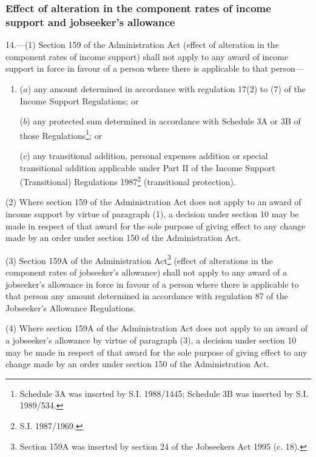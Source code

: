 \documentclass[12pt,a4paper]{article}
\begin{document}
\subsubsection[14. Effect of alteration in the component rates of income support and jobseeker’s allowance]{Effect of alteration in the component rates of income support and jobseeker’s allowance}

14.—(1) Section 159 of the Administration Act (effect of alteration in the component rates of income support) shall not apply to any award of income support in force in favour of a person where there is applicable to that person—
\begin{enumerate}\item[]
($a$) any amount determined in accordance with regulation 17(2) to (7) of the Income Support Regulations; or

($b$) any protected sum determined in accordance with Schedule 3A or 3B of those Regulations\footnote{\frenchspacing Schedule 3A was inserted by S.I. 1988/1445; Schedule 3B was inserted by S.I. 1989/534.}; or

($c$) any transitional addition, personal expenses addition or special transitional addition applicable under Part II of the Income Support (Transitional) Regulations 1987\footnote{\frenchspacing S.I. 1987/1969.} (transitional protection).
\end{enumerate}

(2) Where section 159 of the Administration Act does not apply to an award of income support by virtue of paragraph (1), a decision under section 10 may be made in respect of that award for the sole purpose of giving effect to any change made by an order under section 150 of the Administration Act.

(3) Section 159A of the Administration Act\footnote{\frenchspacing Section 159A was inserted by section 24 of the Jobseekers Act 1995 (c. 18).} (effect of alterations in the component rates of jobseeker’s allowance) shall not apply to any award of a jobseeker’s allowance in force in favour of a person where there is applicable to that person any amount determined in accordance with regulation 87 of the Jobseeker’s Allowance Regulations.

(4) Where section 159A of the Administration Act does not apply to an award of a jobseeker’s allowance by virtue of paragraph (3), a decision under section 10 may be made in respect of that award for the sole purpose of giving effect to any change made by an order under section 150 of the Administration Act.
\end{document}
